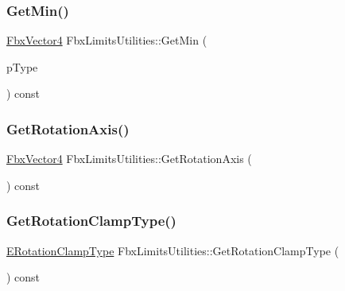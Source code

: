 \subsubsection{\texorpdfstring{Get\+Min()}{GetMin()}}
{\footnotesize\ttfamily \hyperlink{class_fbx_vector4}{Fbx\+Vector4} Fbx\+Limits\+Utilities\+::\+Get\+Min (\begin{DoxyParamCaption}\item[{\hyperlink{class_fbx_limits_utilities_aa55167751039b3d64b56cb7e58f2e62c}{E\+Type}}]{p\+Type }\end{DoxyParamCaption}) const}

\mbox{\label{class_fbx_limits_utilities_accbb4c66f1e0769ce4893814d4415372}} 
\subsubsection{\texorpdfstring{Get\+Rotation\+Axis()}{GetRotationAxis()}}
{\footnotesize\ttfamily \hyperlink{class_fbx_vector4}{Fbx\+Vector4} Fbx\+Limits\+Utilities\+::\+Get\+Rotation\+Axis (\begin{DoxyParamCaption}{ }\end{DoxyParamCaption}) const}

\mbox{\label{class_fbx_limits_utilities_a665cefafe64f564fc4f5841f84bac8f4}} 
\subsubsection{\texorpdfstring{Get\+Rotation\+Clamp\+Type()}{GetRotationClampType()}}
{\footnotesize\ttfamily \hyperlink{class_fbx_limits_utilities_a6724e1b0b6ba776ecb0c66e7b0ed075d}{E\+Rotation\+Clamp\+Type} Fbx\+Limits\+Utilities\+::\+Get\+Rotation\+Clamp\+Type (\begin{DoxyParamCaption}{ }\end{DoxyParamCaption}) const}

\mbox{\label{class_fbx_limits_utilities_a8e3e2905e30827006ce2f0d205649479}} 
